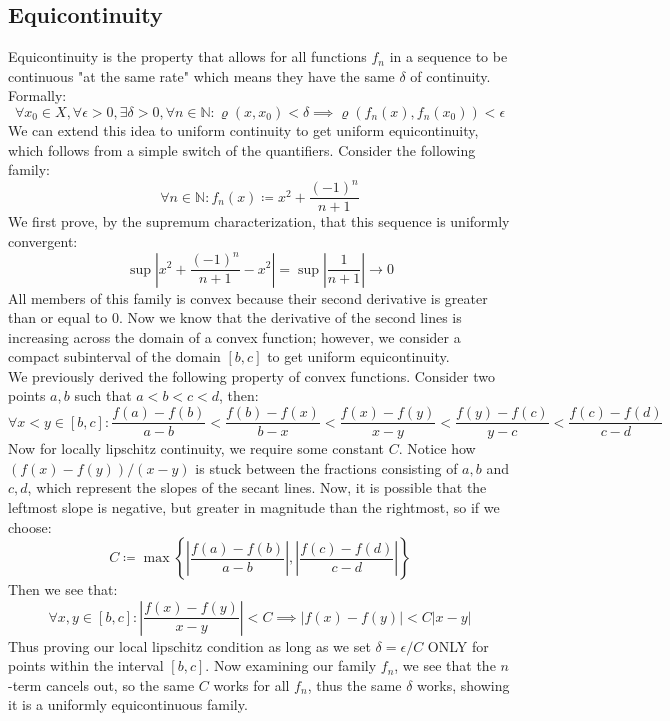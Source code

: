 \documentclass[10pt,letterpaper]{article} %
\begin{document}
\subsection{Equicontinuity}
Equicontinuity is the property that allows for all functions $f_n$ in a sequence to be continuous "at the same rate" which means they have the same $\delta$ of continuity. Formally:
\begin{equation*}
  \forall x_0 \in X, \forall \epsilon > 0, \exists \delta > 0, \forall n \in \mathbb{N}: \varrho(x, x_0) < \delta \implies \varrho(f_n(x), f_n(x_0)) < \epsilon
\end{equation*}
We can extend this idea to uniform continuity to get uniform equicontinuity, which follows from a simple switch of the quantifiers. Consider the following family:
\begin{equation*}
  \forall n \in \mathbb{N}: f_n(x) \coloneq x^2 + \frac{(-1)^n}{n+1}
\end{equation*}
We first prove, by the supremum characterization, that this sequence is uniformly convergent:
\begin{equation*}
  \sup\left|x^2 + \frac{(-1)^n}{n+1} - x^2\right| = \sup\left|\frac{1}{n+1}\right| \xrightarrow{} 0
\end{equation*}
All members of this family is convex because their second derivative is greater than or equal to $0$. Now we know that the derivative of the second lines is increasing across the domain of a convex function; however, we consider a compact subinterval of the domain $[b, c]$ to get uniform equicontinuity.\\

We previously derived the following property of convex functions. Consider two points $a, b$ such that $a < b < c < d$, then:
\begin{equation*}
\forall x < y \in [b, c]: \frac{f(a) - f(b)}{a-b} < \frac{f(b) - f(x)}{b-x} < \frac{f(x) - f(y)}{x-y} < \frac{f(y) - f(c)}{y-c} < \frac{f(c) - f(d)}{c-d}
\end{equation*}
Now for locally lipschitz continuity, we require some constant $C$. Notice how $(f(x) - f(y))/(x-y)$ is stuck between the fractions consisting of $a, b$ and $c, d$, which represent the slopes of the secant lines. Now, it is possible that the leftmost slope is negative, but greater in magnitude than the rightmost, so if we choose:
\begin{equation*}
  C \coloneq \max\left\{\left|\frac{f(a) - f(b)}{a-b}\right|, \left|\frac{f(c) - f(d)}{c-d}\right|\right\}
\end{equation*}
Then we see that:
\begin{equation*}
  \forall x, y \in [b, c]: \left|\frac{f(x) - f(y)}{x-y}\right| < C \implies |f(x) - f(y)| < C|x-y|
\end{equation*}
Thus proving our local lipschitz condition as long as we set $\delta = \epsilon/C$ ONLY for points within the interval $[b, c]$. Now examining our family $f_n$, we see that the $n$-term cancels out, so the same $C$ works for all $f_n$, thus the same $\delta$ works, showing it is a uniformly equicontinuous family.\\
\end{document}
